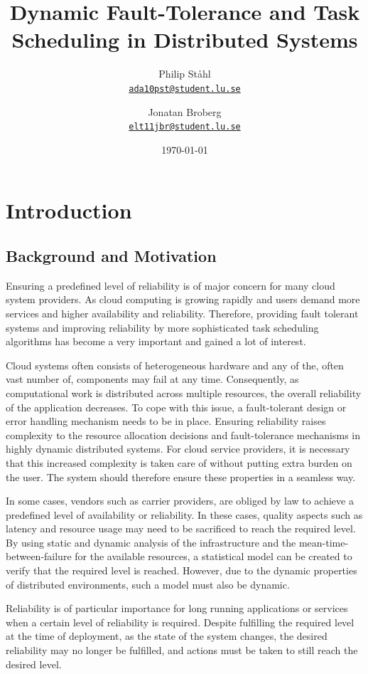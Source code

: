 \documentclass{cslthse-msc}
\author{
	Philip Ståhl \\
	{\normalsize \href{mailto:ada10pst@student.lu.se}{\texttt{ada10pst@student.lu.se}}}
	\and
	Jonatan Broberg \\
    {\normalsize \href{mailto:elt11jbr@student.lu.se
}{\texttt{elt11jbr@student.lu.se}}}
}
\title{Dynamic Fault-Tolerance and Task Scheduling in Distributed Systems}
\subtitle{}
\date{\today}
\begin{document}
\makefrontmatter

\chapter{Introduction} \label{ch:introduction} 
\section{Background and Motivation} \label{sec:introduction_backgroud_motivation}
Ensuring a predefined level of reliability is of major concern for many cloud system providers. As cloud computing is growing rapidly and users demand more services and higher availability and reliability. Therefore, providing fault tolerant systems and improving reliability by more sophisticated task scheduling algorithms has become a very important and gained a lot of interest.

Cloud systems often consists of heterogeneous hardware and any of the, often vast number of, components may fail at any time. Consequently, as computational work is distributed across multiple resources, the overall reliability of the application decreases. To cope with this issue, a fault-tolerant design or error handling mechanism needs to be in place. Ensuring reliability raises complexity to the resource allocation decisions and fault-tolerance mechanisms in highly dynamic distributed systems. For cloud service providers, it is necessary that this increased complexity is taken care of without putting extra burden on the user. The system should therefore ensure these properties in a seamless way.

In some cases, vendors such as carrier providers, are obliged by law to achieve a predefined level of availability or reliability. In these cases, quality aspects such as latency and resource usage may need to be sacrificed to reach the required level. By using static and dynamic analysis of the infrastructure and the mean-time-between-failure for the available resources, a statistical model can be created to verify that the required level is reached. However, due to the dynamic properties of distributed environments, such a model must also be dynamic. 

Reliability is of particular importance for long running applications or services when a certain level of reliability is required. Despite fulfilling the required level at the time of deployment, as the state of the system changes, the desired reliability may no longer be fulfilled, and actions must be taken to still reach the desired level.
\end{document}
